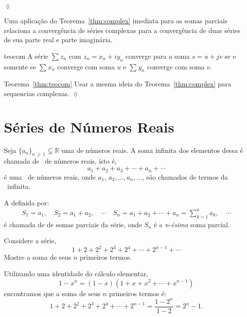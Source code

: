 \solo   \hfill \(\lozenge\)


Uma aplicação do Teorema~\ref{thm:complex} imediata para as somas parciais relaciona a convergência de séries 
complexas para a convergência de duas séries de sua parte real e parte imaginária.   
\begin{theoc}{}{teocom}
A s\'erie $\sum_{}z_{n}$ com $z_n=x_n+iy_n$ converge
para a soma $s=u+jv$ se e somente se $\sum_{} x_{n}$
converge com soma $u$ e $\sum_{} y_{n}$ converge com
soma $v$.
\end{theoc}

\begin{prvc}{Teorema~\ref{thm:teocom}}{}
Usar a mesma ideia  do Teorema~\ref{thm:complex} para sequencias complexas. \hfill \(\lozenge\)
\end{prvc}

\section{S\'{e}ries de N\'{u}meros Reais}

Seja \(\{a_{n}\}_{n\, \geq\, 1} \subsetneq \mathbb{R}\) uma \seq de n\'{u}meros reais. A soma infinita
dos elementos dessa \seq \'{e} chamada de \ser\ de n\'{u}meros reais,
isto \'{e},
\begin{equation*}
  a_1+a_2+a_3+\cdots+a_n+\cdots
\end{equation*}
\'{e} uma \ser\ de n\'{u}meros reais, onde $a_1$, $a_2,\ldots,a_n,\ldots$,
s\~{a}o chamados de termos da \ser\ infinita.

A \seq {} definida por:
\begin{align*}
 S_1 = a_1, \quad S_2 =a_1+a_2, \quad  \cdots \quad  S_n=a_1+a_2+\cdots + a_n=\sum_{k=1}^{n}a_k, \quad   \cdots
\end{align*}
\'{e} chamada de \seq de somas parciais da s\'{e}rie, onde $S_n$ \'{e} a \textit{n-\'{e}sima} soma parcial.

\begin{exer}
  Considere a s\'{e}rie,
\begin{equation*}
  1+2+2^2+2^3+2^4+\cdots+2^{n-1}+\cdots
\end{equation*}
Mostre a soma de seus $n$ primeiros termos.
\end{exer}

\solo Utilizando uma identidade do c\'{a}lculo elementar,
\begin{equation}\label{iden1}
    1-x^n=(1-x)(1+x+x^2+\cdots+x^{n-1})
\end{equation}
encontramos que  a soma de seus $n$ primeiros termos \'{e}:
\begin{equation*}
  1+2+2^2+2^3+2^4+\cdots+2^{n-1}=\frac{1-2^n}{1-2}=2^n-1.
\end{equation*}

